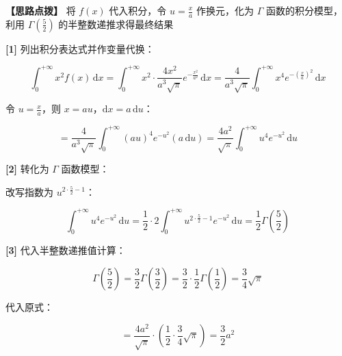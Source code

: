 \documentclass[11pt,a4paper,UTF8]{ctexart}
\begin{document}
\textbf{\color{DeepPurple}【思路点拨】} 将 $f(x)$ 代入积分，令 $u = \frac{x}{a}$ 作换元，化为 $\Gamma$ 函数的积分模型，利用 $\Gamma(\frac{5}{2})$ 的半整数递推求得最终结果


\begin{solbox}[分步推导与答题规范]
\textbf{[1]} 列出积分表达式并作变量代换：


\begin{equation*}
\int_0^{+\infty} x^2 f(x)\,\mathrm{d}x = \int_0^{+\infty} x^2 \cdot \frac{4x^2}{a^3\sqrt{\pi}} e^{-\frac{x^2}{a^2}}\,\mathrm{d}x = \frac{4}{a^3\sqrt{\pi}}\int_0^{+\infty} x^4 e^{-\left(\frac{x}{a}\right)^2}\,\mathrm{d}x
\end{equation*}


令 $u = \frac{x}{a}$，则 $x = au$，$\mathrm{d}x = a\,\mathrm{d}u$：


\begin{equation*}
= \frac{4}{a^3\sqrt{\pi}}\int_0^{+\infty} (au)^4 e^{-u^2} (a\,\mathrm{d}u) = \frac{4a^2}{\sqrt{\pi}}\int_0^{+\infty} u^4 e^{-u^2}\,\mathrm{d}u
\end{equation*}


\textbf{[2]} 转化为 $\Gamma$ 函数模型：

改写指数为 $u^{2 \cdot \frac{5}{2} - 1}$：


\begin{equation*}
\int_0^{+\infty} u^4 e^{-u^2}\,\mathrm{d}u = \frac{1}{2} \cdot 2\int_0^{+\infty} u^{2 \cdot \frac{5}{2} - 1} e^{-u^2}\,\mathrm{d}u = \frac{1}{2}\Gamma\left(\frac{5}{2}\right)
\end{equation*}


\textbf{[3]} 代入半整数递推值计算：


\begin{equation*}
\Gamma\left(\frac{5}{2}\right) = \frac{3}{2}\Gamma\left(\frac{3}{2}\right) = \frac{3}{2} \cdot \frac{1}{2}\Gamma\left(\frac{1}{2}\right) = \frac{3}{4}\sqrt{\pi}
\end{equation*}


代入原式：


\begin{equation*}
= \frac{4a^2}{\sqrt{\pi}} \cdot \left(\frac{1}{2} \cdot \frac{3}{4}\sqrt{\pi}\right) = \frac{3}{2}a^2
\end{equation*}

\end{solbox}
\end{document}
